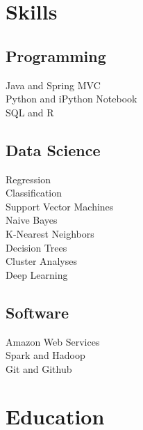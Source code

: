 \documentclass[letterpaper]{deedy-resume} %
\begin{document}
\begin{minipage}[t]{0.33\textwidth} %


\section{Skills}

\subsection{Programming}
Java and Spring MVC \\
Python and iPython Notebook \\
SQL and R\\

\sectionspace %

\subsection{Data Science}
Regression \\
Classification \\
Support Vector Machines \\
Naive Bayes \\
K-Nearest Neighbors \\
Decision Trees \\
Cluster Analyses \\
Deep Learning \\

\sectionspace %

\subsection{Software}
Amazon Web Services \\
Spark and Hadoop \\
Git and Github \\

\sectionspace %


\section{Education} 


\end{minipage}
\end{document}
